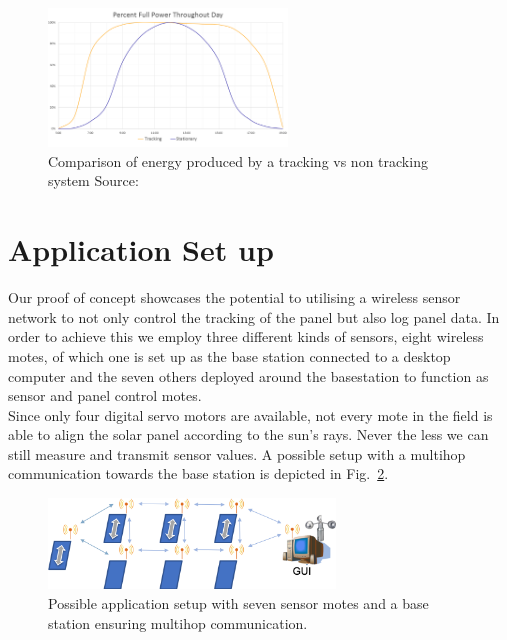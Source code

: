 \documentclass[conference]{IEEEtran}
\begin{document}
\begin{figure}[htbp]
    \includegraphics[width=2.5in]{img/ComparisonTrackingVsNoTracking.png}
    \centering
    \captionsetup{justification=centering}
    \caption{Comparison of energy produced by a tracking vs non tracking system Source: \cite{b3}}
    \label{fig:ComparisonTvsNT}
\end{figure}

%


\section{Application Set up}

Our proof of concept showcases the potential to utilising a wireless sensor network to not only control the tracking of the panel but also log panel data. In order to achieve this we employ three different kinds of sensors, eight wireless motes, of which one is set up as the base station connected to a desktop computer and the seven others deployed around the basestation to function as sensor and panel control motes.\\
Since only four digital servo motors are available, not every mote in the field is able to align the solar panel according to the sun's rays. Never the less we can still measure and transmit sensor values. A possible setup with a multihop communication towards the base station is depicted in Fig.~\ref{fig:ApplicationSetup}.

\begin{figure}[htbp]
    \includegraphics[width=3in]{img/Application_Setup.png}
    \centering
    \captionsetup{justification=centering}
    \caption{Possible application setup with seven sensor motes and a base station ensuring multihop communication.}
    \label{fig:ApplicationSetup}
\end{figure}
\end{document}

